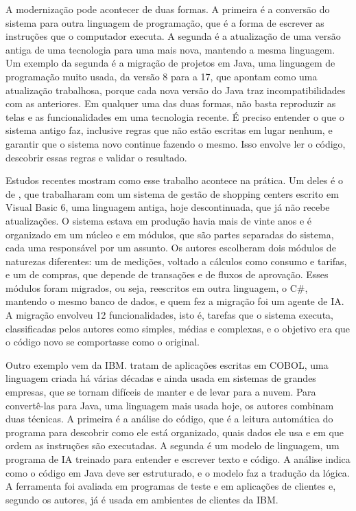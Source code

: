 A modernização pode acontecer de duas formas. A primeira é a conversão do sistema para outra linguagem de programação, que é a forma de escrever as instruções que o computador executa. A segunda é a atualização de uma versão antiga de uma tecnologia para uma mais nova, mantendo a mesma linguagem. Um exemplo da segunda é a migração de projetos em Java, uma linguagem de programação muito usada, da versão 8 para a 17, que  apontam como uma atualização trabalhosa, porque cada nova versão do Java traz incompatibilidades com as anteriores. Em qualquer uma das duas formas, não basta reproduzir as telas e as funcionalidades em uma tecnologia recente. É preciso entender o que o sistema antigo faz, inclusive regras que não estão escritas em lugar nenhum, e garantir que o sistema novo continue fazendo o mesmo. Isso envolve ler o código, descobrir essas regras e validar o resultado.

Estudos recentes mostram como esse trabalho acontece na prática. Um deles é o de , que trabalharam com um sistema de gestão de shopping centers escrito em Visual Basic 6, uma linguagem antiga, hoje descontinuada, que já não recebe atualizações. O sistema estava em produção havia mais de vinte anos e é organizado em um núcleo e em módulos, que são partes separadas do sistema, cada uma responsável por um assunto. Os autores escolheram dois módulos de naturezas diferentes: um de medições, voltado a cálculos como consumo e tarifas, e um de compras, que depende de transações e de fluxos de aprovação. Esses módulos foram migrados, ou seja, reescritos em outra linguagem, o C\#, mantendo o mesmo banco de dados, e quem fez a migração foi um agente de IA. A migração envolveu 12 funcionalidades, isto é, tarefas que o sistema executa, classificadas pelos autores como simples, médias e complexas, e o objetivo era que o código novo se comportasse como o original.

Outro exemplo vem da IBM.  tratam de aplicações escritas em COBOL, uma linguagem criada há várias décadas e ainda usada em sistemas de grandes empresas, que se tornam difíceis de manter e de levar para a nuvem. Para convertê-las para Java, uma linguagem mais usada hoje, os autores combinam duas técnicas. A primeira é a análise do código, que é a leitura automática do programa para descobrir como ele está organizado, quais dados ele usa e em que ordem as instruções são executadas. A segunda é um modelo de linguagem, um programa de IA treinado para entender e escrever texto e código. A análise indica como o código em Java deve ser estruturado, e o modelo faz a tradução da lógica. A ferramenta foi avaliada em programas de teste e em aplicações de clientes e, segundo os autores, já é usada em ambientes de clientes da IBM.

